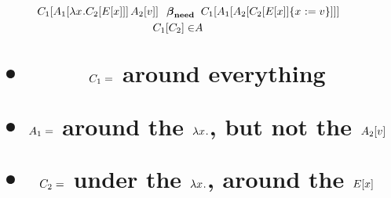 \documentclass[11pt]{article}
\begin{document}
\title{\normalsize
\begin{align*}
\inC[_1]{\ap{\inA[_1]{\lx\inC[_2]{\Ex}}}{\Av[_2]}}
\;\;\betaneednr&\;\;
\inC[_1]{\inA[_1]{\inA[_2]{\substx{\inC[_2]{\Ex}}{\val}}}} \\
\inC[_1]{\C_2} \in& \A \\
\end{align*}
\small
\begin{itemize}
\item  $\C_1 =$ around everything
\item  $\A_1 =$ around the $\lx$, but not the $\Av[_2]$
\item  $\C_2 =$ under the $\lx$, around the $\Ex$
\end{itemize}
}
\date{}
\author{}
\maketitle
\end{document}
